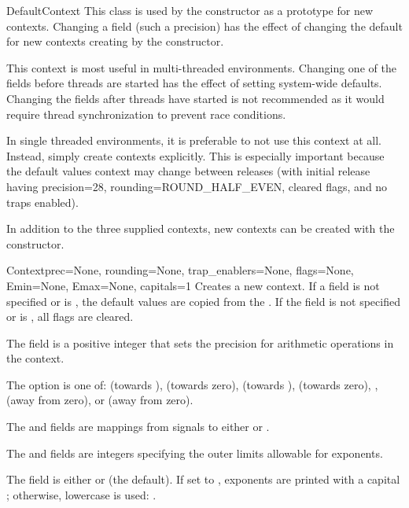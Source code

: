 \begin{classdesc*}{DefaultContext}
  This class is used by the  constructor as a prototype for
  new contexts.  Changing a field (such a precision) has the effect of
  changing the default for new contexts creating by the 
  constructor.

  This context is most useful in multi-threaded environments.  Changing one of
  the fields before threads are started has the effect of setting system-wide
  defaults.  Changing the fields after threads have started is not recommended
  as it would require thread synchronization to prevent race conditions.

  In single threaded environments, it is preferable to not use this context
  at all.  Instead, simply create contexts explicitly.  This is especially
  important because the default values context may change between releases
  (with initial release having precision=28, rounding=ROUND_HALF_EVEN,
  cleared flags, and no traps enabled).
\end{classdesc*}


In addition to the three supplied contexts, new contexts can be created
with the  constructor.

\begin{classdesc}{Context}{prec=None, rounding=None, trap_enablers=None,
        flags=None, Emin=None, Emax=None, capitals=1}
  Creates a new context.  If a field is not specified or is ,
  the default values are copied from the .  If the
   field is not specified or is , all flags are
  cleared.

  The  field is a positive integer that sets the precision for
  arithmetic operations in the context.

  The  option is one of:
       (towards ),
       (towards zero),
       (towards ),
       (towards zero),
      ,
       (away from zero), or
       (away from zero).

  The  and  fields are mappings from signals
  to either  or .

  The  and  fields are integers specifying the outer
  limits allowable for exponents.

  The  field is either  or  (the
  default). If set to , exponents are printed with a capital
  ; otherwise, lowercase is used:  .
\end{classdesc}

